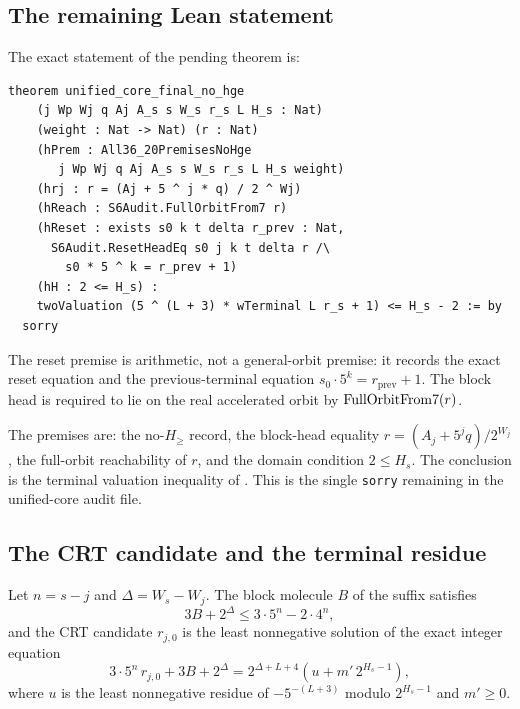 \subsection{The remaining Lean statement}

The exact statement of the pending theorem is:
\begin{verbatim}
theorem unified_core_final_no_hge
    (j Wp Wj q Aj A_s s W_s r_s L H_s : Nat)
    (weight : Nat -> Nat) (r : Nat)
    (hPrem : All36_20PremisesNoHge
       j Wp Wj q Aj A_s s W_s r_s L H_s weight)
    (hrj : r = (Aj + 5 ^ j * q) / 2 ^ Wj)
    (hReach : S6Audit.FullOrbitFrom7 r)
    (hReset : exists s0 k t delta r_prev : Nat,
      S6Audit.ResetHeadEq s0 j k t delta r /\
        s0 * 5 ^ k = r_prev + 1)
    (hH : 2 <= H_s) :
    twoValuation (5 ^ (L + 3) * wTerminal L r_s + 1) <= H_s - 2 := by
  sorry
\end{verbatim}

The reset premise is arithmetic, not a general-orbit premise: it
records the exact reset equation and the previous-terminal equation
$s_0\cdot5^k=r_{\mathrm{prev}}+1$.  The block head is required to lie
on the real accelerated orbit by $\mathrm{FullOrbitFrom7}(r)$.

The premises are: the no-$H_{\ge}$ record, the block-head equality
$r=(A_j+5^jq)/2^{W_j}$, the full-orbit reachability of $r$, and the
domain condition $2\le H_s$.  The conclusion is the terminal valuation
inequality of \Cref{thm:core}.  This is the single \texttt{sorry}
remaining in the unified-core audit file.

\subsection{The CRT candidate and the terminal residue}

Let $n=s-j$ and $\Delta=W_s-W_j$.  The block molecule $B$ of the suffix
satisfies
\begin{equation*}
  3B+2^\Delta\le 3\cdot5^n-2\cdot4^n,
\end{equation*}
and the CRT candidate $r_{j,0}$ is the least nonnegative solution of
the exact integer equation
\begin{equation*}
  3\cdot5^n\,r_{j,0}+3B+2^\Delta
    =2^{\Delta+L+4}\left(u+m'\,2^{H_s-1}\right),
\end{equation*}
where $u$ is the least nonnegative residue of
$-5^{-(L+3)}$ modulo $2^{H_s-1}$ and $m'\ge0$.

